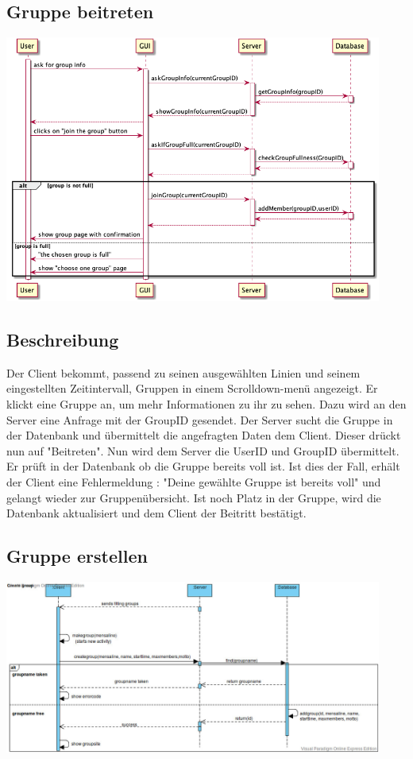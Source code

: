 \documentclass[a4paper]{scrreprt}
\begin{document}
\subsection{Gruppe beitreten}
\begin{center}
	\includegraphics[width=0.93\textwidth]{Sequenzdiagramme/SD_checkInfo&joinGroup.png}
\end{center}

\subsection*{Beschreibung}
Der Client bekommt, passend zu seinen ausgewählten Linien und seinem eingestellten Zeitintervall, Gruppen in einem Scrolldown-menü angezeigt.
Er klickt eine Gruppe an, um mehr Informationen zu ihr zu sehen. Dazu wird an den Server eine Anfrage mit der GroupID gesendet. Der Server sucht die Gruppe in der Datenbank und übermittelt die angefragten Daten dem Client. Dieser drückt nun auf "Beitreten". Nun wird dem Server die UserID und GroupID übermittelt. Er prüft in der Datenbank ob die Gruppe bereits voll ist. Ist dies der Fall, erhält der Client eine Fehlermeldung : "Deine gewählte Gruppe ist bereits voll" und gelangt wieder zur Gruppenübersicht. Ist noch Platz in der Gruppe, wird die Datenbank aktualisiert und dem Client der Beitritt bestätigt. 

\newpage
\subsection{Gruppe erstellen}
\begin{center}
	\includegraphics[width=0.93\textwidth]{Sequenzdiagramme/CreateGroup.jpg}
\end{center}
\end{document}
